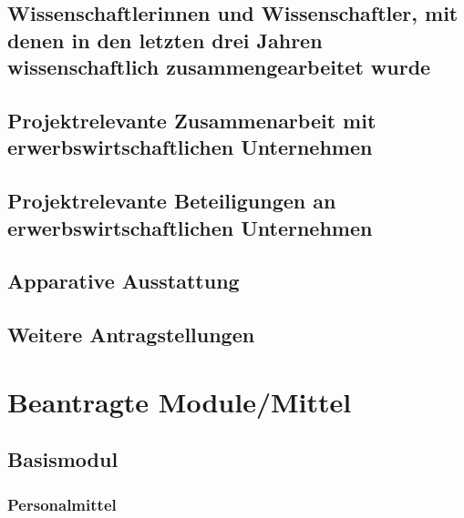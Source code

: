 \documentclass{scrartcl}
\begin{document}
\subsection{Wissenschaftlerinnen und Wissenschaftler, mit denen in den letzten drei Jahren wissenschaftlich zusammengearbeitet wurde}

\subsection{Projektrelevante Zusammenarbeit mit erwerbswirtschaftlichen Unternehmen}

\subsection{Projektrelevante Beteiligungen an erwerbswirtschaftlichen Unternehmen}

\subsection{Apparative Ausstattung}

\subsection{Weitere Antragstellungen}


\section{Beantragte Module/Mittel}

\subsection{Basismodul}

\subsubsection{Personalmittel}
\begin{funds}[Personalmittel]


\end{funds}
\end{document}
